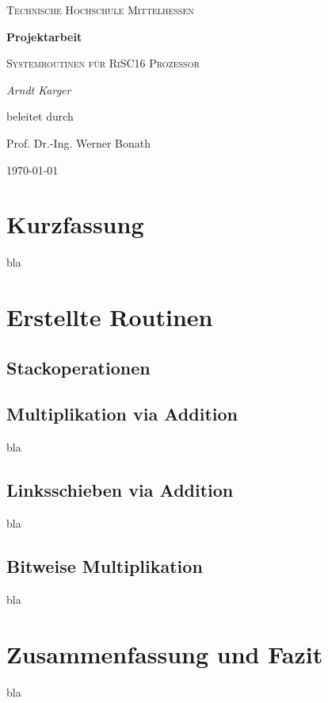\documentclass[fleqn, a4paper, 12pt]{article}       %
\begin{document}
\begin{titlepage}
	\centering
	{\scshape\LARGE Technische Hochschule Mittelhessen \par}
	\vspace{1cm}
	{\huge\bfseries Projektarbeit \par}
	\vspace{1.5cm}
	{\scshape\Large Systemroutinen für RiSC16 Prozessor \par}
	\vspace{2cm}
	{\Large\itshape Arndt Karger\par}
	\vfill
	beleitet durch\par
    Prof. Dr.-Ing. Werner Bonath
	\vfill

	{\large \today\par}
\end{titlepage}

\newpage
\setcounter{page}{0}
\tableofcontents
\newpage


\section{Kurzfassung}
bla

\section{Erstellte Routinen}
\subsection{Stackoperationen}
\subsection{Multiplikation via Addition}
bla
\subsection{Linksschieben via Addition}
bla
\subsection{Bitweise Multiplikation}
bla

\section{Zusammenfassung und Fazit}
bla
\end{document}
